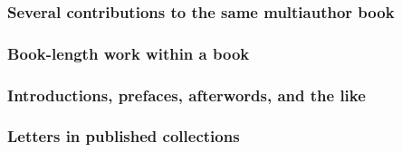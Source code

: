 \documentclass[11pt,letterpaper,oneside]{article}
\begin{document}
\subsubsection{Several contributions to the same multiauthor book}

\begin{citebib}
\item \cite[84--87]{keating1968}
\item \cite[362--70]{lippincott1968}
\item \cite{draper1987}
\item \cite{harrington1987}
\item \cite{zukowsky1987}
\end{citebib}

\subsubsection{Book-length work within a book}

\begin{citebib}
\item \cite{bernard1990a}
\item \cite{updike1995a}
\end{citebib}

\subsubsection{Introductions, prefaces, afterwords, and the like}

\begin{citebib}
\item \cite{morrison2004b.f}
\item \cite{mansfield2000}
\end{citebib}

\subsubsection{Letters in published collections}

\begin{citebib}
\item \cite[133--34]{adams1867}
\item \cite{jackson1676}
\end{citebib}

\setcounter{subsubsection}{112}
\end{document}
